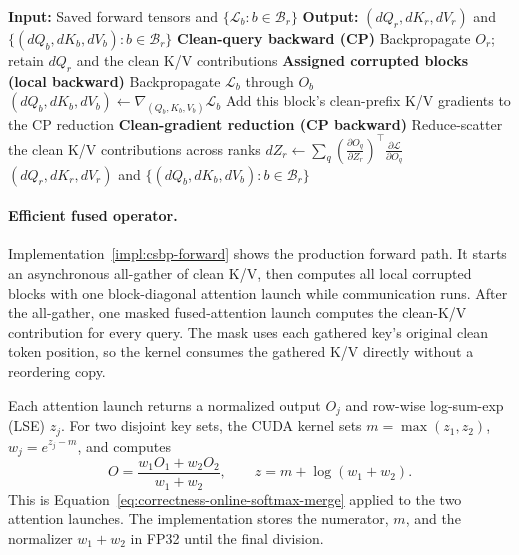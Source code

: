 \begin{algorithm}[H]
\small
\caption{CSBP attention backward on rank $r$}
\label{alg:csbp-backward}
\begin{algorithmic}[1]
\State \textbf{Input:} Saved forward tensors and
  $\{\mathcal L_b:b\in\mathcal B_r\}$
\State \textbf{Output:} $(dQ_r,dK_r,dV_r)$ and
  $\{(dQ_b,dK_b,dV_b):b\in\mathcal B_r\}$
\Statex
\State \textbf{Clean-query backward (CP)}
\State Backpropagate $O_r$; retain $dQ_r$ and the clean K/V contributions
\Statex
\State \textbf{Assigned corrupted blocks (local backward)}
  \State Backpropagate $\mathcal L_b$ through $O_b$
  \State $(dQ_b,dK_b,dV_b)
    \gets\nabla_{(Q_b,K_b,V_b)}\mathcal L_b$
  \State Add this block's clean-prefix K/V gradients to the CP reduction
\EndFor
\Statex
\State \textbf{Clean-gradient reduction (CP backward)}
\State Reduce-scatter the clean K/V contributions across ranks
  \State $\displaystyle dZ_r\gets
    \sum_q\left(\frac{\partial O_q}{\partial Z_r}\right)^{\!\top}
    \frac{\partial\mathcal L}{\partial O_q}$
\EndFor
\State \Return $(dQ_r,dK_r,dV_r)$ and
  $\{(dQ_b,dK_b,dV_b):b\in\mathcal B_r\}$
\end{algorithmic}
\end{algorithm}

\clearpage
\paragraph{Efficient fused operator.}
Implementation~\ref{impl:csbp-forward} shows the production forward path. It
starts an asynchronous all-gather of clean K/V, then computes all local
corrupted blocks with one block-diagonal attention launch while communication
runs. After the all-gather, one masked fused-attention launch computes the
clean-K/V contribution for every query. The mask uses each gathered key's
original clean token position, so the kernel consumes the gathered K/V directly
without a reordering copy.

Each attention launch returns a normalized output $O_j$ and row-wise
log-sum-exp (LSE) $z_j$.  For two disjoint key sets, the CUDA kernel sets
$m=\max(z_1,z_2)$, $w_j=e^{z_j-m}$, and computes
\begin{equation}
  O=\frac{w_1O_1+w_2O_2}{w_1+w_2},\qquad
  z=m+\log(w_1+w_2).
  \label{eq:csbp-lse-merge}
\end{equation}
This is Equation~\ref{eq:correctness-online-softmax-merge} applied to the two
attention launches.  The implementation stores the numerator, $m$, and the
normalizer $w_1+w_2$ in FP32 until the final division.

